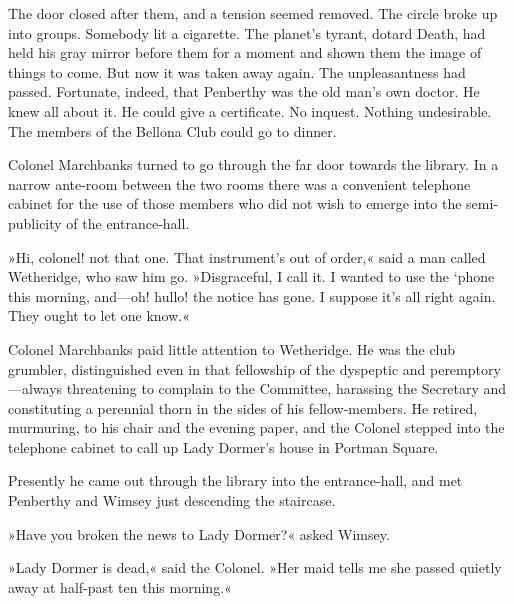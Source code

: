 The door closed after them, and a tension seemed removed. The circle broke up into groups. Somebody lit a cigarette. The planet's tyrant, dotard Death, had held his gray mirror before them for a moment and shown them the image of things to come. But now it was taken away again. The unpleasantness had passed. Fortunate, indeed, that Penberthy was the old man's own doctor. He knew all about it. He could give a certificate. No inquest. Nothing undesirable. The members of the Bellona Club could go to dinner.

Colonel Marchbanks turned to go through the far door towards the library. In a narrow ante-room between the two rooms there was a convenient telephone cabinet for the use of those members who did not wish to emerge into the semi-publicity of the entrance-hall.

»Hi, colonel! not that one. That instrument's out of order,« said a man called Wetheridge, who saw him go. »Disgraceful, I call it. I wanted to use the `phone this morning, and—oh! hullo! the notice has gone. I suppose it's all right again. They ought to let one know.«

Colonel Marchbanks paid little attention to Wetheridge. He was the club grumbler, distinguished even in that fellowship of the dyspeptic and peremptory—always threatening to complain to the Committee, harassing the Secretary and constituting a perennial thorn in the sides of his fellow-members. He retired, murmuring, to his chair and the evening paper, and the Colonel stepped into the telephone cabinet to call up Lady Dormer's house in Portman Square.

Presently he came out through the library into the entrance-hall, and met Penberthy and Wimsey just descending the staircase.

»Have you broken the news to Lady Dormer?« asked Wimsey.

»Lady Dormer is dead,« said the Colonel. »Her maid tells me she passed quietly away at half-past ten this morning.«